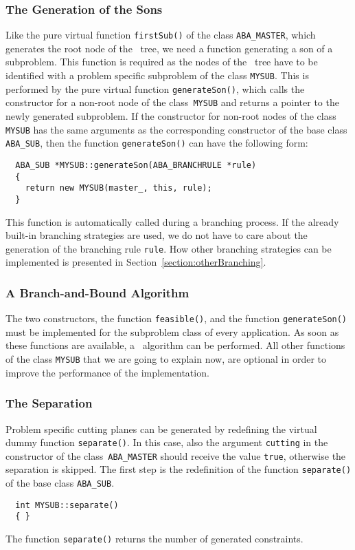 \subsubsection{The Generation of the Sons}

Like the pure virtual function {\tt firstSub()} of the class {\tt ABA\_MASTER},
which generates the root node of the \bab\ tree, we need a function
generating a son of a subproblem. This function is required as the
nodes of the \bab\ tree have to be identified with a problem specific
subproblem of the class {\tt MYSUB}.
This is performed by the pure 
virtual function {\tt generateSon()}, which calls the constructor for
a non-root node of the class~{\tt MYSUB} and returns a pointer to the
newly generated subproblem. If the constructor for non-root nodes
of the class {\tt MYSUB} has the same arguments as the corresponding
constructor of the base class {\tt ABA\_SUB}, then the function
{\tt generateSon()} can have the following form:
\begin{verbatim}
  ABA_SUB *MYSUB::generateSon(ABA_BRANCHRULE *rule)
  {
    return new MYSUB(master_, this, rule);
  }
\end{verbatim}
This function is automatically called during a branching process. If the
already built-in branching strategies are used, we
do not have to care about the generation of the branching rule {\tt rule}.
How other branching strategies can be implemented is presented in 
Section~\ref{section:otherBranching}.

\subsubsection{A Branch-and-Bound Algorithm}
\noindent
The two constructors, the function {\tt feasible()}, and the function
{\tt generateSon()} must be implemented for the subproblem class of
every application. As soon as these functions are available, a 
\bab\ algorithm can be performed. All other functions of the
class {\tt MYSUB} that we are going to explain now, are optional
in order to improve the performance of the implementation.

\subsubsection{The Separation}

Problem specific cutting planes can be generated by redefining the
virtual dummy function {\tt separate()}. In this case, also the argument
{\tt cutting} in the constructor of the class~{\tt ABA\_MASTER} should receive
the value {\tt true}, otherwise the separation is skipped.
The first step is the redefinition of the function {\tt separate()} of
the base class {\tt ABA\_SUB}.
\begin{verbatim}
  int MYSUB::separate()
  { }
\end{verbatim}
The function {\tt separate()} returns the number of generated constraints.

